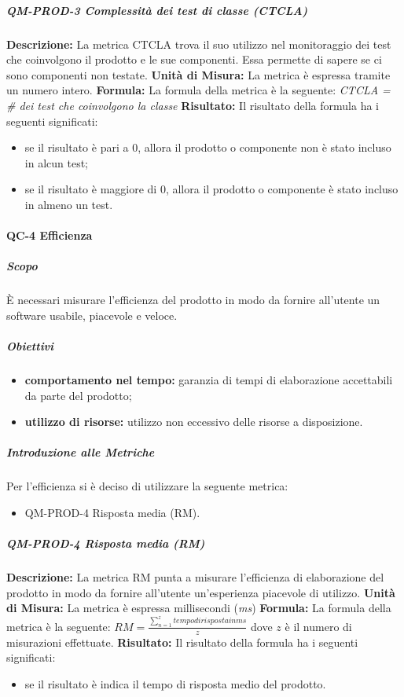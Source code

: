 			\subparagraph{QM-PROD-3 Complessità dei test di classe (CTCLA)}
				\textbf{Descrizione: }
					La metrica CTCLA trova il suo utilizzo nel monitoraggio dei test che coinvolgono il prodotto e le sue componenti. Essa permette di sapere se ci sono componenti non testate.
				\textbf{Unità di Misura: }
					La metrica è espressa tramite un numero intero.
				\textbf{Formula: }
					La formula della metrica è la seguente:
					\textit{CTCLA = \# dei test che coinvolgono la classe}
				\textbf{Risultato: }
					Il risultato della formula ha i seguenti significati:
					\begin{itemize}
						\item se il risultato è pari a 0, allora il prodotto o componente non è stato incluso in alcun test;
						\item se il risultato è maggiore di 0, allora il prodotto o componente è stato incluso in almeno un test.
					\end{itemize}

		\paragraph{QC-4 Efficienza}
			\subparagraph{Scopo}
				È necessari misurare l'efficienza del prodotto in modo da fornire all'utente un software usabile, piacevole e veloce.
				\subparagraph{Obiettivi}
					\begin{itemize}
						\item \textbf{comportamento nel tempo:} garanzia di tempi di elaborazione accettabili da parte del prodotto;
						\item \textbf{utilizzo di risorse:} utilizzo non eccessivo delle risorse a disposizione.
					\end{itemize}
			\subparagraph{Introduzione alle Metriche}
				Per l'efficienza si è deciso di utilizzare la seguente metrica:
				\begin{itemize}
					\item QM-PROD-4 Risposta media (RM).
				\end{itemize}
			\subparagraph{QM-PROD-4 Risposta media (RM)}
				\textbf{Descrizione: }
					La metrica RM punta a misurare l'efficienza di elaborazione del prodotto in modo da fornire all'utente un'esperienza piacevole di utilizzo.
				\textbf{Unità di Misura: }
					La metrica è espressa millisecondi (\textit{ms})
				\textbf{Formula: }
					La formula della metrica è la seguente:
					\(
						RM = \frac{\sum_{n=1}^{z} tempo di risposta in ms}{z}
					\)
					dove $z$ è il numero di misurazioni effettuate.
				\textbf{Risultato: }
					Il risultato della formula ha i seguenti significati:
					\begin{itemize}
						\item se il risultato è indica il tempo di risposta medio del prodotto.
					\end{itemize}

